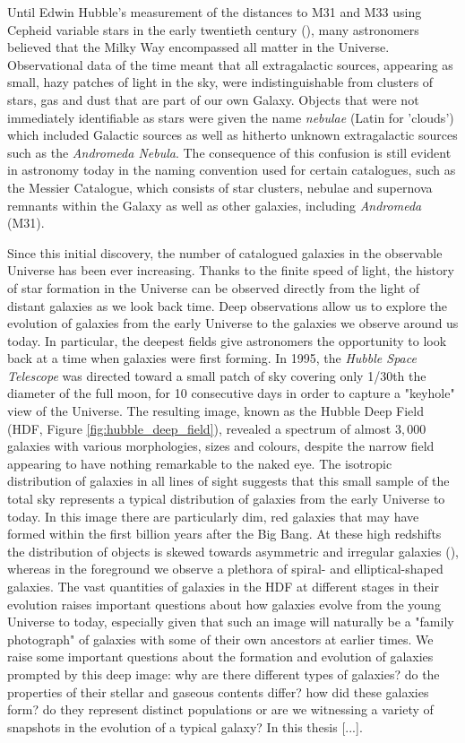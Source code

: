 Until Edwin Hubble's measurement of the distances to M31 and M33 using Cepheid variable stars in the early twentieth century (\citealt{Hubble_1925}), many astronomers believed that the Milky Way encompassed all matter in the Universe. Observational data of the time meant that all extragalactic sources, appearing as small, hazy patches of light in the sky, were indistinguishable from clusters of stars, gas and dust that are part of our own Galaxy. Objects that were not immediately identifiable as stars were given the name \textit{nebulae} (Latin for 'clouds') which included Galactic sources as well as hitherto unknown extragalactic sources such as the \textit{Andromeda Nebula}. The consequence of this confusion is still evident in astronomy today in the naming convention used for certain catalogues, such as the Messier Catalogue, which consists of star clusters, nebulae and supernova remnants within the Galaxy as well as other galaxies, including \textit{Andromeda} (M31).

Since this initial discovery, the number of catalogued galaxies in the observable Universe has been ever increasing. Thanks to the finite speed of light, the history of star formation in the Universe can be observed directly from the light of distant galaxies as we look back time. Deep observations allow us to explore the evolution of galaxies from the early Universe to the galaxies we observe around us today. In particular, the deepest fields give astronomers the opportunity to look back at a time when galaxies were first forming. In 1995, the \textit{Hubble Space Telescope} was directed toward a small patch of sky covering only 1/30th the diameter of the full moon, for 10 consecutive days in order to capture a "keyhole" view of the Universe. The resulting image, known as the Hubble Deep Field (HDF, Figure \ref{fig:hubble_deep_field}), revealed a spectrum of almost $3,000$ galaxies with various morphologies, sizes and colours, despite the narrow field appearing to have nothing remarkable to the naked eye. The isotropic distribution of galaxies in all lines of sight suggests that this small sample of the total sky represents a typical distribution of galaxies from the early Universe to today. In this image there are particularly dim, red galaxies that may have formed within the first billion years after the Big Bang. At these high redshifts the distribution of objects is skewed towards asymmetric and irregular galaxies (\citealt{Abraham_1996}), whereas in the foreground we observe a plethora of spiral- and elliptical-shaped galaxies. The vast quantities of galaxies in the HDF at different stages in their evolution raises important questions about how galaxies evolve from the young Universe to today, especially given that such an image will naturally be a "family photograph" of galaxies with some of their own ancestors at earlier times. We raise some important questions about the formation and evolution of galaxies prompted by this deep image: why are there different types of galaxies? do the properties of their stellar and gaseous contents differ? how did these galaxies form? do they represent distinct populations or are we witnessing a variety of snapshots in the evolution of a typical galaxy? In this thesis {\color{red}[...]}.

